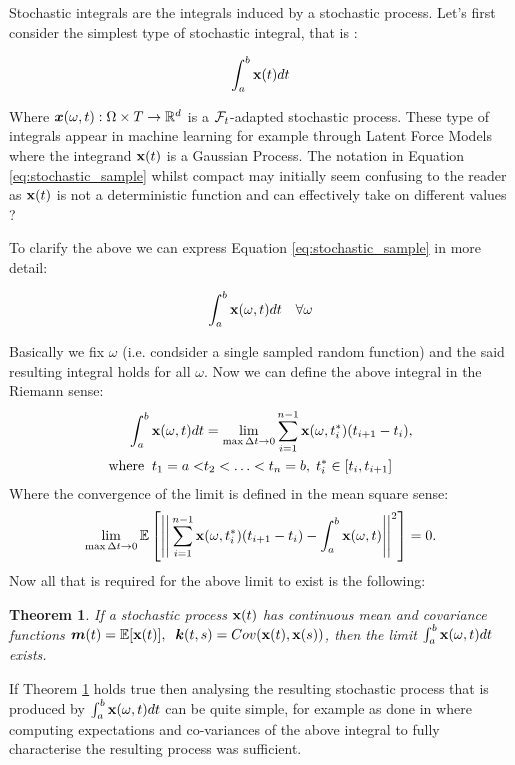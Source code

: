 \documentclass[a4paper,12pt,twoside,openright]{report}
\newtheorem{theorem}{Theorem}
\theoremstyle{definition}
\begin{document}
Stochastic integrals are the integrals induced by a stochastic process. Let's first consider the simplest type of stochastic integral, that is :

\begin{align} \label{eq:stochastic_sample}
    \int_{a}^{b} {\mathbf{x}}(t) dt
\end{align}

Where ${\bm{x}}(\omega, t): \Omega \times T \rightarrow {\mathbb{R}}^d$ is a ${\mathcal{F}}_t$-adapted stochastic process. These type of integrals appear in machine learning for example through Latent Force Models \cite{alvarez2009latent,alvarez2013linear} where the integrand ${\mathbf{x}}(t)$ is a Gaussian Process. The notation in Equation \ref{eq:stochastic_sample} whilst compact may initially seem confusing to the reader as ${\mathbf{x}}(t)$ is not a deterministic function and can effectively take on different values ?

To clarify the above we can express  Equation \ref{eq:stochastic_sample} in more detail:

\begin{align*}
    \int_{a}^{b} {\mathbf{x}}(\omega, t) dt \quad \forall \omega
\end{align*}

Basically we fix $\omega$ (i.e. condsider a single sampled random function) and the said resulting integral holds for all $\omega$.  Now we can define the above integral in the Riemann sense:
\begin{align*}
    \int_{a}^{b} {\mathbf{x}}(\omega, t) dt &= \lim_{ \max \Delta t \rightarrow 0} \sum_{i=1}^{n-1} {\mathbf{x}}(\omega, t_i^{*}) (t_{i+1} - t_i), \\
    \text{where} \;\; t_1 = a < &t_2 < \hdots < t_n = b, \;  t_i^{*} \in [ t_i, t_{i+1}]
\end{align*}
Where the convergence of the limit is defined in the mean square sense:
\begin{align*}
    \lim_{\max \Delta t \rightarrow 0} \mathbb{E} \left[ \Bigg|\Bigg|\sum_{i=1}^{n-1} {\mathbf{x}}(\omega, t_i^{*}) (t_{i+1} - t_i)-  \int_{a}^{b} {\mathbf{x}}(\omega, t) \Bigg|\Bigg|^2\right] =  0.
\end{align*}
Now all that is required for the above limit to exist is the following:
\begin{theorem}\label{thrm:ito_simple}
  If a stochastic process ${\mathbf{x}}(t)$ has continuous mean and covariance functions ${\bm{m}}(t) = \mathbb{E}[{\mathbf{x}}(t)],\;\; {\bm{k}}(t, s) = Cov({\mathbf{x}}(t), {\mathbf{x}}(s))$, then the limit $\int_{a}^{b} {\mathbf{x}}(\omega, t) dt$ exists.
\end{theorem}
If Theorem \ref{thrm:ito_simple} holds true then analysing the resulting stochastic process that is produced by $\int_{a}^{b} {\mathbf{x}}(\omega, t) dt$ can be quite simple, for example as done in \cite{alvarez2009latent} where computing expectations and co-variances of the above integral to fully characterise the resulting process was sufficient.
 
\end{document}
